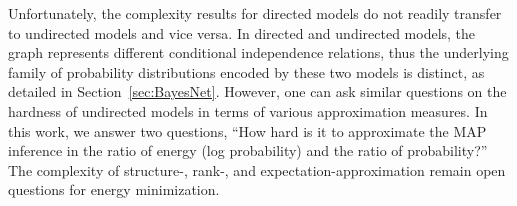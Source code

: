 
Unfortunately, the complexity results for directed models do not readily transfer to undirected models and vice versa. In directed and undirected models, the graph represents different conditional independence relations, thus the underlying family of probability distributions encoded by these two models is distinct, as detailed in Section~\ref{sec:BayesNet}. However, one can ask similar questions on the hardness of undirected models in terms of various approximation measures. In this work, we answer two questions, ``How hard is it to approximate the MAP inference in the ratio of energy (log probability) and the ratio of probability?'' The complexity of structure-, rank-, and expectation-approximation remain open questions for energy minimization.





